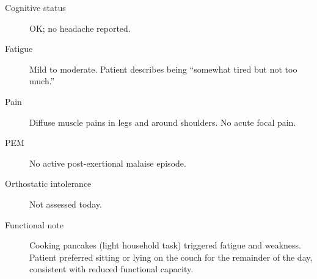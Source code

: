 \begin{description}
  \item[Cognitive status] OK; no headache reported.
  \item[Fatigue] Mild to moderate. Patient describes being ``somewhat tired but not too
    much.''
  \item[Pain] Diffuse muscle pains in legs and around shoulders. No acute focal pain.
  \item[PEM] No active post-exertional malaise episode.
  \item[Orthostatic intolerance] Not assessed today.
  \item[Functional note] Cooking pancakes (light household task) triggered fatigue and
    weakness. Patient preferred sitting or lying on the couch for the remainder of the
    day, consistent with reduced functional capacity.
\end{description}
